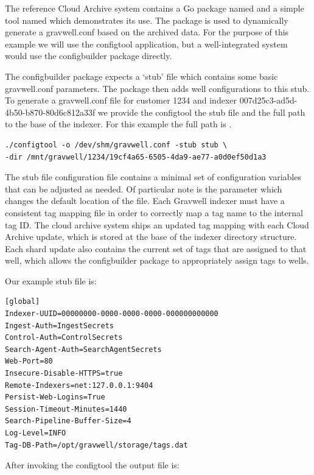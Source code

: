 The reference Cloud Archive system contains a Go package named
 and a simple tool named  which
demonstrates its use. The  package is used to
dynamically generate a gravwell.conf based on the archived data.
For the purpose of this example we will use the
configtool application, but a well-integrated system would use the
configbuilder package directly.

The configbuilder package expects a `stub' file which contains some
basic gravwell.conf parameters. The package then adds well configurations
to this stub. To generate a gravwell.conf file for customer
1234 and indexer 007d25c3-ad5d-4b50-b870-80d6c812a33f we provide
the configtool the stub file and the full path to the base of the
indexer. For this example the full path is
.

\begin{Verbatim}[breaklines=true]
./configtool -o /dev/shm/gravwell.conf -stub stub \
-dir /mnt/gravwell/1234/19cf4a65-6505-4da9-ae77-a0d0ef50d1a3
\end{Verbatim}

The stub file configuration file contains a minimal set of
configuration variables that can be adjusted as needed. Of particular
note is the \code{Tag-DB-Path} parameter which changes the default location
of the \code{tags.dat} file. Each Gravwell indexer must have a consistent
tag mapping file in order to correctly map a tag name to the internal
tag ID. The cloud archive system ships an updated tag mapping with each
Cloud Archive update, which is stored at the base of the indexer
directory structure. Each shard update also contains the current set of
tags that are assigned to that well, which allows the
configbuilder package to appropriately assign tags to wells.

Our example stub file is:

\begin{Verbatim}[breaklines=true]
[global]
Indexer-UUID=00000000-0000-0000-0000-000000000000
Ingest-Auth=IngestSecrets
Control-Auth=ControlSecrets
Search-Agent-Auth=SearchAgentSecrets
Web-Port=80
Insecure-Disable-HTTPS=true
Remote-Indexers=net:127.0.0.1:9404
Persist-Web-Logins=True
Session-Timeout-Minutes=1440
Search-Pipeline-Buffer-Size=4
Log-Level=INFO
Tag-DB-Path=/opt/gravwell/storage/tags.dat
\end{Verbatim}


After invoking the configtool the output  file is:

